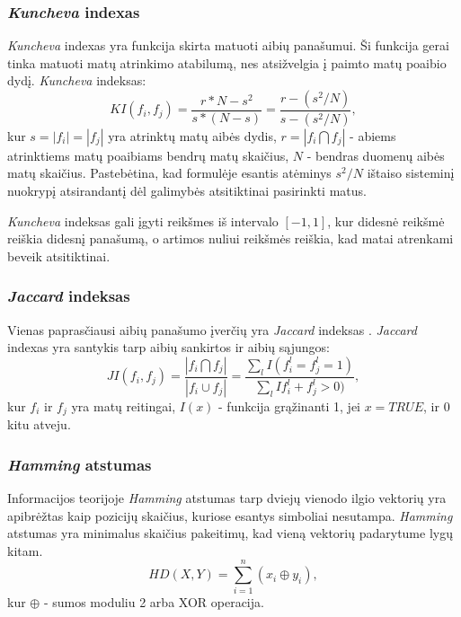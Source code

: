 \subsubsection{\textit{Kuncheva} indexas}

\textit{Kuncheva} indexas \cite{DBLP:conf/aia/Kuncheva07} yra funkcija skirta matuoti aibių panašumui. Ši funkcija gerai tinka matuoti matų atrinkimo atabilumą, nes atsižvelgia į paimto matų poaibio dydį. \textit{Kuncheva} indeksas:
\begin{equation}
\label{kuncheva_index}
 KI(f_i, f_j)=\frac{r*N - s^2}{s*(N-s)}=\frac{r - (s^2/N)}{s - (s^2/N)},
\end{equation}		
kur $s=|f_i|=|f_j|$ yra atrinktų matų aibės dydis, $r=|f_i \bigcap f_j|$ - abiems atrinktiems matų poaibiams bendrų matų skaičius, $N$ - bendras  duomenų aibės matų skaičius. Pastebėtina, kad formulėje esantis atėminys $s^2/N$ ištaiso sisteminį nuokrypį atsirandantį dėl galimybės atsitiktinai pasirinkti matus. 

\textit{Kuncheva} indeksas gali įgyti reikšmes iš intervalo $[-1, 1]$, kur didesnė reikšmė reiškia didesnį panašumą, o artimos nuliui reikšmės reiškia, kad matai atrenkami beveik atsitiktinai.

\subsubsection{\textit{Jaccard} indeksas}

Vienas paprasčiausi aibių panašumo įverčių yra \textit{Jaccard} indeksas \cite{jaccard1901etude}. \textit{Jaccard} indexas yra santykis tarp aibių sankirtos ir aibių sąjungos:
\begin{equation}
\label{jaccard_index}
 JI(f_i, f_j)=\frac{|f_i \bigcap f_j|}{|f_i \cup f_j|}=\frac{\sum_{l}I(f_i^l=f_j^l=1)}{\sum_{l}I{f_i^l+f_j^l > 0)}}, 
\end{equation}
kur $f_i$ ir $f_j$ yra matų reitingai, $I(x)$ - funkcija grąžinanti 1, jei $x=TRUE$, ir 0 kitu atveju.

\subsubsection{\textit{Hamming} atstumas}

Informacijos teorijoje \textit{Hamming} atstumas \cite{hamming1950error} tarp dviejų vienodo ilgio vektorių yra apibrėžtas kaip pozicijų skaičius, kuriose esantys simboliai nesutampa. \textit{Hamming} atstumas yra minimalus skaičius pakeitimų, kad vieną vektorių padarytume lygų kitam. 
\begin{equation}
\label{hamming_distance}
 HD(X, Y)= \sum_{i=1}^{n} (x_i \oplus y_i),
\end{equation}
kur $\oplus$ - sumos moduliu 2 arba XOR operacija.

